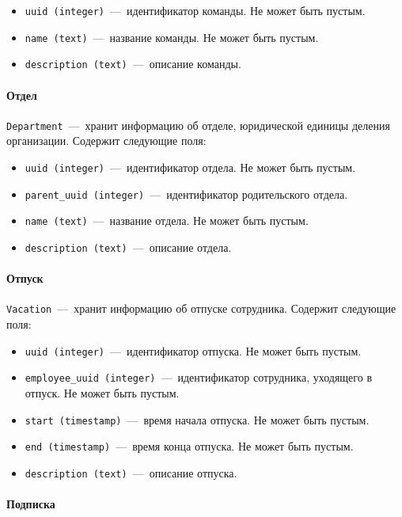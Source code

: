\begin{itemize}
	\item \texttt{uuid (integer)}~---~идентификатор команды. Не может быть пустым.
	\item \texttt{name (text)}~---~название команды. Не может быть пустым.
	\item \texttt{description (text)}~---~описание команды.
\end{itemize}

\paragraph{Отдел} \mbox{}

\texttt{Department}~---~хранит информацию об отделе, юридической единицы деления организации. Содержит следующие поля:

\begin{itemize}
	\item \texttt{uuid (integer)}~---~идентификатор отдела. Не может быть пустым.
	\item \texttt{parent\_uuid (integer)}~---~идентификатор родительского отдела.
	\item \texttt{name (text)}~---~название отдела. Не может быть пустым.
	\item \texttt{description (text)}~---~описание отдела.
\end{itemize}

\paragraph{Отпуск} \mbox{}

\texttt{Vacation}~---~хранит информацию об отпуске сотрудника. Содержит следующие поля:

\begin{itemize}
	\item \texttt{uuid (integer)}~---~идентификатор отпуска. Не может быть пустым.
	\item \texttt{employee\_uuid (integer)}~---~идентификатор сотрудника, уходящего в отпуск. Не может быть пустым.
	\item \texttt{start (timestamp)}~---~время начала отпуска. Не может быть пустым.
	\item \texttt{end (timestamp)}~---~время конца отпуска. Не может быть пустым.
	\item \texttt{description (text)}~---~описание отпуска.
\end{itemize}

\paragraph{Подписка} \mbox{}

